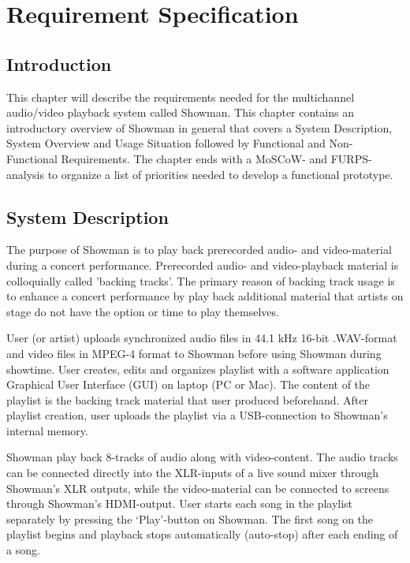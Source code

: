 \chapter{Requirement Specification}
\section{Introduction}
This chapter will describe the requirements needed for the multichannel audio/video playback system called Showman. This chapter contains an introductory overview of Showman in general that covers a System Description, System Overview and Usage Situation followed by Functional and Non-Functional Requirements. The chapter ends with a MoSCoW- and FURPS-analysis to organize a list of priorities needed to develop a functional prototype. \newline

\section{System Description}

The purpose of Showman is to play back prerecorded audio- and video-material during a concert performance. Prerecorded audio- and video-playback material  is colloquially called 'backing tracks'. The primary reason of backing track usage is to enhance a concert performance by play back additional material that artists on stage do not have the option or time to play themselves. \newline

User (or artist) uploads synchronized audio files in 44.1 kHz 16-bit .WAV-format and video files in MPEG-4 format to Showman before using Showman during showtime. User creates, edits and organizes playlist with a software application Graphical User Interface (GUI) on laptop (PC or Mac). The content of the playlist is the backing track material that user produced beforehand. After playlist creation, user uploads the playlist via a USB-connection to Showman's internal memory. \newline

Showman play back 8-tracks of audio along with video-content. The audio tracks can be connected directly into the XLR-inputs of a live sound mixer through Showman's XLR outputs, while the video-material can be connected to screens through Showman's HDMI-output.
User starts each song in the playlist separately by pressing the `Play'-button on Showman. The first song on the playlist begins and playback stops automatically (auto-stop) after each ending of a song. \newline


